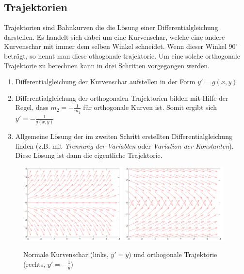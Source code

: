\subsection{Trajektorien}
Trajektorien sind Bahnkurven die die Lösung einer Differentialgleichung
darstellen. Es handelt sich dabei um eine Kurvenschar, welche eine andere
Kurvenschar mit immer dem selben Winkel schneidet. Wenn dieser Winkel
$90^{\circ}$ beträgt, so nennt man diese othogonale trajektorie.
Um eine solche orthogonale Trajektorie zu berechnen kann in drei Schritten
vorgegangen werden.
\begin{enumerate}
  \item Differentialgleichung der Kurvenschar aufstellen in der Form
	$y'=g(x,y)$
  \item Differentialgleichung der orthogonalen Trajektorien bilden
	mit Hilfe der Regel, dass $m_2=-\frac{1}{m_1}$ für orthogonale
	Kurven ist. Somit ergibt sich $y'=-\frac{1}{g(x,y)}$
  \item Allgemeine Lösung der im zweiten Schritt erstellten
	Differentialgleichung finden (z.B. mit \emph{Trennung der Variablen}
	oder \emph{Variation der Konstanten}). Diese Lösung ist dann die 
	eigentliche Trajektorie.
\end{enumerate}

\begin{figure}[h!]
	\centering
	\includegraphics[width=0.48\textwidth]{trajektorien1.pdf}
	\includegraphics[width=0.48\textwidth]{trajektorien2.pdf}
	\caption{Normale Kurvenschar (links, $y'=y$) 
	und orthogonale Trajektorie (rechts, $y'=-\frac{1}{y}$)}
\end{figure}

